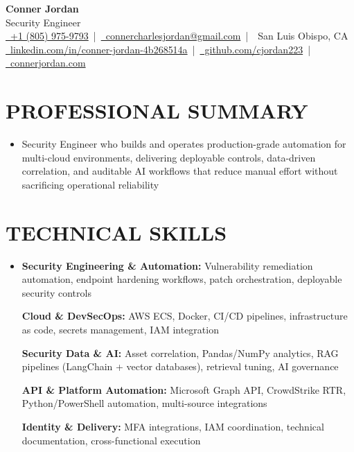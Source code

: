 \documentclass[letterpaper,10pt]{article}
\newcommand{\resumeSubHeadingListStart}{\begin{itemize}[leftmargin=0in,label={}]}
\newcommand{\resumeSubHeadingListEnd}{\end{itemize}}
\begin{document}
\begin{center}
  {\Huge \textbf{Conner Jordan}}\\[0pt]
  {\Large Security Engineer}\\[0pt]
  \href{tel:+18059759793}{\faPhone\ +1 (805) 975-9793} \,|\, 
  \href{mailto:connercharlesjordan@gmail.com}{\faEnvelope\ connercharlesjordan@gmail.com} \,|\, 
  \faMapMarker\ San Luis Obispo, CA \\[-2pt]
  \href{https://www.linkedin.com/in/conner-jordan-4b268514a/}{\faLinkedin\ linkedin.com/in/conner-jordan-4b268514a}
  \,|\, \href{https://github.com/cjordan223}{\faGithub\ github.com/cjordan223}
  \,|\, \href{https://connerjordan.com/}{\faGlobe\ connerjordan.com}
\end{center}

\vspace{4pt}

\section{PROFESSIONAL SUMMARY}
\vspace{8pt}
\resumeSubHeadingListStart
\item {\small
Security Engineer who builds and operates production-grade automation for multi-cloud environments, delivering deployable controls, data-driven correlation, and auditable AI workflows that reduce manual effort without sacrificing operational reliability}
\resumeSubHeadingListEnd
\vspace{6pt}

\section{TECHNICAL SKILLS}
\vspace{6pt}
\resumeSubHeadingListStart
\item {\small
\textbf{Security Engineering \& Automation:} Vulnerability remediation automation, endpoint hardening workflows, patch orchestration, deployable security controls

\vspace{3pt}
\textbf{Cloud \& DevSecOps:} AWS ECS, Docker, CI/CD pipelines, infrastructure as code, secrets management, IAM integration

\vspace{3pt}
\textbf{Security Data \& AI:} Asset correlation, Pandas/NumPy analytics, RAG pipelines (LangChain + vector databases), retrieval tuning, AI governance

\vspace{3pt}
\textbf{API \& Platform Automation:} Microsoft Graph API, CrowdStrike RTR, Python/PowerShell automation, multi-source integrations

\vspace{3pt}
\textbf{Identity \& Delivery:} MFA integrations, IAM coordination, technical documentation, cross-functional execution
}
\resumeSubHeadingListEnd
\vspace{6pt}
\end{document}
